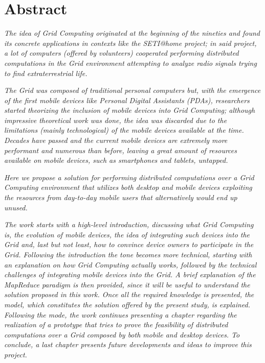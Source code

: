 \chapter*{Abstract}
\begin{spacing}{1.3}
\textit{\small
The idea of Grid Computing originated at the beginning of the nineties and found its concrete applications in contexts like the SETI@home project; in said project, a lot of computers (offered by volunteers) cooperated performing distributed computations in the Grid environment attempting to analyze radio signals trying to find extraterrestrial life.
}\newline

\textit{\small
The Grid was composed of traditional personal computers but, with the emergence of the first mobile devices like Personal Digital Assistants (PDAs), researchers started theorizing the inclusion of mobile devices into Grid Computing; although impressive theoretical work was done, the idea was discarded due to the limitations (mainly technological) of the mobile devices available at the time. Decades have passed and the current mobile devices are extremely more performant and numerous than before, leaving a great amount of resources available on mobile devices, such as smartphones and tablets, untapped.
}\newline

\textit{\small
Here we propose a solution for performing distributed computations over a Grid Computing environment that utilizes both desktop and mobile devices exploiting the resources from day-to-day mobile users that alternatively would end up unused.
}\newline

\textit{\small
The work starts with a high-level introduction, discussing what Grid Computing is, the evolution of mobile devices, the idea of integrating such devices into the Grid and, last but not least, how to convince device owners to participate in the Grid. Following the introduction the tone becomes more technical, starting with an explanation on how Grid Computing actually works, followed by the technical challenges of integrating mobile devices into the Grid. A brief explanation of the MapReduce paradigm is then provided, since it will be useful to understand the solution proposed in this work. Once all the required knowledge is presented, the model, which constitutes the solution offered by the present study, is explained. Following the mode, the work continues presenting a chapter regarding the realization of a prototype that tries to prove the feasibility of distributed computations over a Grid composed by both mobile and desktop devices. To conclude, a last chapter presents future developments and ideas to improve this project.
}
\end{spacing}
